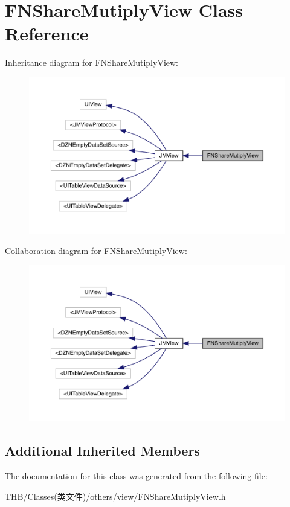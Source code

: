 \hypertarget{interface_f_n_share_mutiply_view}{}\section{F\+N\+Share\+Mutiply\+View Class Reference}
\label{interface_f_n_share_mutiply_view}


Inheritance diagram for F\+N\+Share\+Mutiply\+View\+:\nopagebreak
\begin{figure}[H]
\begin{center}
\leavevmode
\includegraphics[width=350pt]{interface_f_n_share_mutiply_view__inherit__graph}
\end{center}
\end{figure}


Collaboration diagram for F\+N\+Share\+Mutiply\+View\+:\nopagebreak
\begin{figure}[H]
\begin{center}
\leavevmode
\includegraphics[width=350pt]{interface_f_n_share_mutiply_view__coll__graph}
\end{center}
\end{figure}
\subsection*{Additional Inherited Members}


The documentation for this class was generated from the following file\+:\begin{DoxyCompactItemize}
\item 
T\+H\+B/\+Classes(类文件)/others/view/F\+N\+Share\+Mutiply\+View.\+h\end{DoxyCompactItemize}
